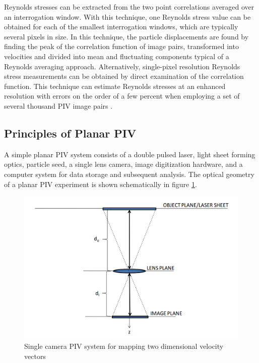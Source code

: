 Reynolds stresses can be extracted from the two point correlations averaged 
over 
an interrogation window. With this technique, one Reynolds stress value can be 
obtained for each of the smallest interrogation windows, which are typically 
several pixels in size. In this technique, the particle displacements are found 
by finding the peak of the correlation function of image pairs, transformed 
into velocities and divided into mean and fluctuating components typical 
of a Reynolds averaging approach. Alternatively, single-pixel resolution 
Reynolds stress measurements can be obtained by direct examination of the 
correlation function. This technique can estimate Reynolds stresses at an 
enhanced resolution with errors on the order of a few percent when employing a 
set of several thousand PIV image pairs \cite{scharnowski2011}.

\subsection{Principles of Planar PIV}

A simple planar PIV system consists of a double pulsed laser, light sheet 
forming optics, particle seed, a single lens camera, image digitization 
hardware, and a computer system for data storage and subsequent analysis. The 
optical geometry of a planar PIV experiment is shown schematically in figure 
\ref{fig:mono_piv}.

\begin{figure}[H]
	\centering
	\includegraphics[width=5in]{figs/piv_method/mono_piv_optics}
	\caption{Single camera PIV system for mapping two dimensional velocity 
		vectors}
	\label{fig:mono_piv}
\end{figure} 

